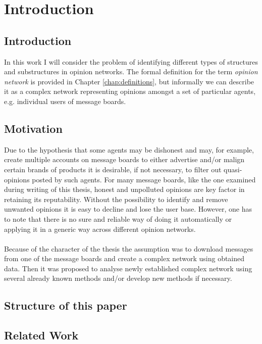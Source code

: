 \chapter{Introduction}

	\section{Introduction}

		In this work I will consider the problem of identifying different types of structures and substructures in opinion networks. The formal definition for the term \emph{opinion network} is provided in Chapter \ref{chap:definitions}, but informally we can describe it as a complex network representing opinions amongst a set of particular agents, e.g. individual users of message boards.
		
	
	\section{Motivation}

		Due to the hypothesis that some agents may be dishonest and may, for example, create multiple accounts on message boards to either advertise and/or malign certain brands of products it is desirable, if not necessary, to filter out quasi-opinions posted by such agents. For many message boards, like the one examined during writing of this thesis, honest and unpolluted opinions are key factor in retaining its reputability. Without the possibility to identify and remove unwanted opinions it is easy to decline and lose the user base. However, one has to note that there is no sure and reliable way of doing it automatically or applying it in a generic way across different opinion networks.
		\\\\
		Because of the character of the thesis the assumption was to download messages from one of the message boards and create a complex network using obtained data. Then it was proposed to analyse newly established complex network using several already known methods and/or develop new methods if necessary.
		
	\section{Structure of this paper}
		
	\section{Related Work}
		